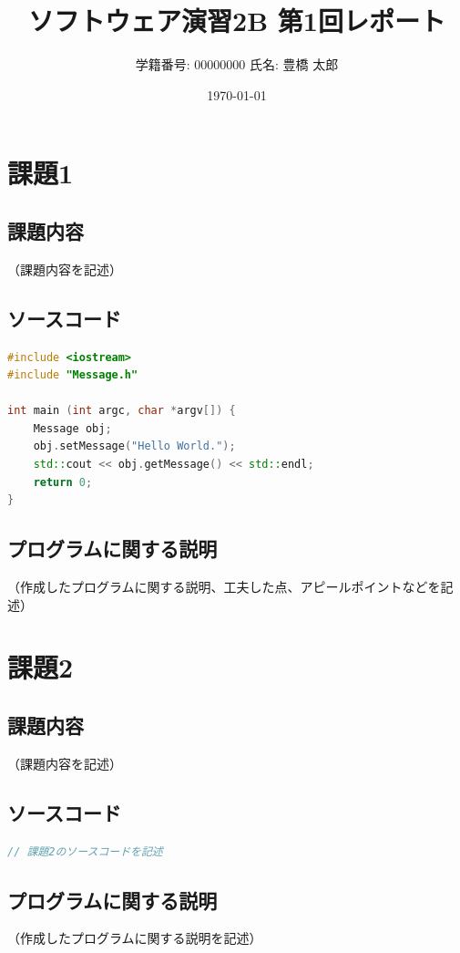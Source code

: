 \documentclass[paper=a4,fontsize=11pt]{jlreq}
\title{ソフトウェア演習2B 第1回レポート}
\author{学籍番号: 00000000 \quad 氏名: 豊橋 太郎}
\date{\today}
\begin{document}
\maketitle

\section{課題1}
\subsection{課題内容}
（課題内容を記述）

\subsection{ソースコード}
\begin{lstlisting}[language=C++, caption=Message.cpp]
#include <iostream>
#include "Message.h"

int main (int argc, char *argv[]) {
    Message obj;
    obj.setMessage("Hello World.");
    std::cout << obj.getMessage() << std::endl;
    return 0;
}
\end{lstlisting}

\subsection{プログラムに関する説明}
（作成したプログラムに関する説明、工夫した点、アピールポイントなどを記述）


\section{課題2}
\subsection{課題内容}
（課題内容を記述）

\subsection{ソースコード}
\begin{lstlisting}[language=C++, caption=main.cpp (課題2)]
// 課題2のソースコードを記述
\end{lstlisting}

\subsection{プログラムに関する説明}
（作成したプログラムに関する説明を記述）
\end{document}
